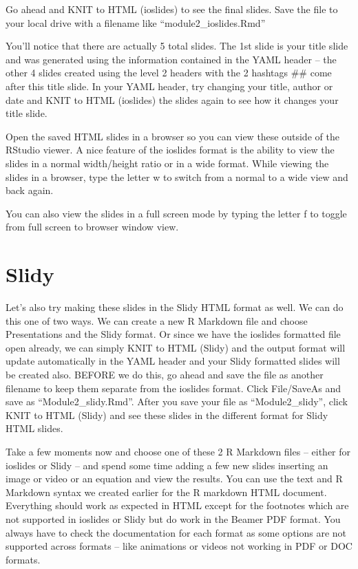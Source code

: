 \documentclass[
]{book}
\begin{document}
Go ahead and KNIT to HTML (ioslides) to see the final slides. Save the file to your local drive with a filename like ``module2\_ioslides.Rmd''

You'll notice that there are actually 5 total slides. The 1st slide is your title slide and was generated using the information contained in the YAML header -- the other 4 slides created using the level 2 headers with the 2 hashtags \#\# come after this title slide. In your YAML header, try changing your title, author or date and KNIT to HTML (ioslides) the slides again to see how it changes your title slide.

Open the saved HTML slides in a browser so you can view these outside of the RStudio viewer. A nice feature of the ioslides format is the ability to view the slides in a normal width/height ratio or in a wide format. While viewing the slides in a browser, type the letter w to switch from a normal to a wide view and back again.

You can also view the slides in a full screen mode by typing the letter f to toggle from full screen to browser window view.

\hypertarget{slidy}{%
\section{Slidy}\label{slidy}}

Let's also try making these slides in the Slidy HTML format as well. We can do this one of two ways. We can create a new R Markdown file and choose Presentations and the Slidy format. Or since we have the ioslides formatted file open already, we can simply KNIT to HTML (Slidy) and the output format will update automatically in the YAML header and your Slidy formatted slides will be created also. BEFORE we do this, go ahead and save the file as another filename to keep them separate from the ioslides format. Click File/SaveAs and save as ``Module2\_slidy.Rmd''.
After you save your file as ``Module2\_slidy'', click KNIT to HTML (Slidy) and see these slides in the different format for Slidy HTML slides.

Take a few moments now and choose one of these 2 R Markdown files -- either for ioslides or Slidy -- and spend some time adding a few new slides inserting an image or video or an equation and view the results. You can use the text and R Markdown syntax we created earlier for the R markdown HTML document. Everything should work as expected in HTML except for the footnotes which are not supported in ioslides or Slidy but do work in the Beamer PDF format. You always have to check the documentation for each format as some options are not supported across formats -- like animations or videos not working in PDF or DOC formats.
\end{document}
